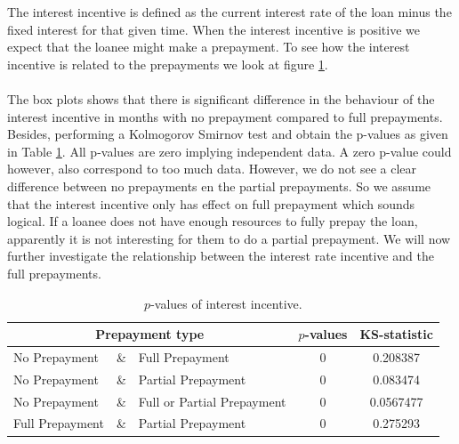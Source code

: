     The interest incentive is defined as the current interest rate 
    of the loan minus the fixed interest for that given time. 
    When the interest incentive is positive we expect that the loanee 
    might make a prepayment. To see how the interest incentive 
    is related to the prepayments we look at figure 
    \ref{pvals_incentive}. 
    \\\\
    The box plots shows that there is significant difference in 
    the behaviour of the interest incentive in months with no 
    prepayment compared to full prepayments. Besides, performing 
    a Kolmogorov Smirnov test and obtain the p-values as given 
    in Table \ref{pvals_incentive}. All p-values are zero implying 
    independent data. A zero p-value could however, also correspond 
    to too much data. 
    However, we do not see a clear difference between no 
    prepayments en the partial prepayments. So we assume that 
    the interest incentive only has effect on full prepayment 
    which sounds logical. If a loanee does not have enough 
    resources to fully prepay the loan, apparently it is not 
    interesting for them to do a partial prepayment. We will 
    now further investigate the relationship between the 
    interest rate incentive and the full prepayments.

    \begin{table}[H]
    \centering
        \begin{tabular}{lcl|c|c}
            \multicolumn{3}{c}{Prepayment type} & $p$-values& KS-statistic \\\hline
            No Prepayment & \& & Full Prepayment & 0 & 0.208387\\
            No Prepayment & \& & Partial Prepayment & 0 & 0.083474\\
            No Prepayment & \& & Full or Partial Prepayment & 0 & 0.0567477 \\
            Full Prepayment & \& & Partial Prepayment & 0 & 0.275293
	    \end{tabular}
        \caption{
            $p$-values of interest incentive.
            }
	    \label{pvals_incentive}
    \end{table}

